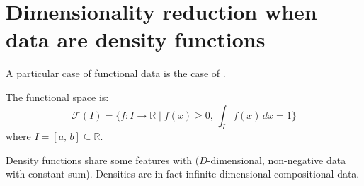\section{Dimensionality reduction when data are density functions}

A particular case of functional data is the case of .

The functional space is:
\begin{equation*}
    \mathcal F(I) = \{
        f : I \to \mathds R \mid f(x) \geq 0,\, \int_I f(x) \,dx = 1
    \}
\end{equation*}
where $I = [a,\,b] \subseteq \mathds R$.

Density functions share some features with 
($D$-dimensional, non-negative data with constant sum).
Densities are in fact infinite dimensional compositional data.

